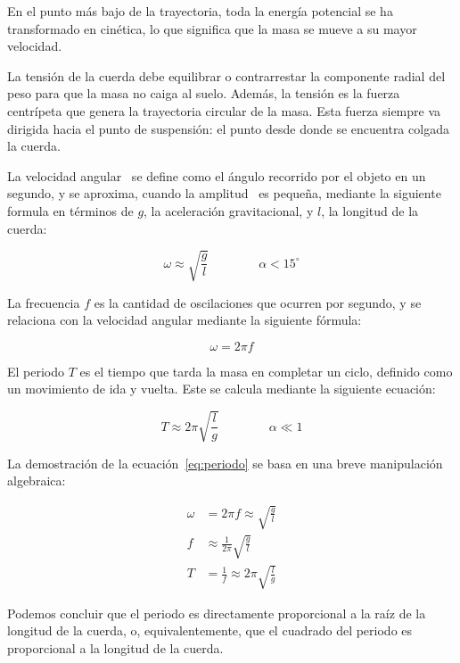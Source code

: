 \documentclass[twocolumn]{article}
\numberwithin{table}{section}
\begin{document}
En el punto más bajo de la trayectoria, toda la energía potencial se
ha transformado en cinética, lo que significa que la masa se mueve a
su mayor velocidad.

La tensión de la cuerda debe equilibrar o contrarrestar la componente
radial del peso para que la masa no caiga al suelo. Además, la
tensión es la fuerza centrípeta que genera la trayectoria circular de
la masa. Esta fuerza siempre va dirigida hacia el punto de
suspensión: el punto desde donde se encuentra colgada la cuerda.

La velocidad angular~\omega{} se define como el ángulo recorrido por
el objeto en un segundo, y se aproxima, cuando la amplitud~\alpha{} es
pequeña, mediante la siguiente formula en términos de $g$, la
aceleración gravitacional, y $l$, la longitud de la cuerda:

\begin{equation}
  \omega \approx \sqrt{\frac{g}{l}} \qquad\qquad \alpha < 15^{\circ}
\end{equation}

La frecuencia $f$ es la cantidad de oscilaciones que ocurren por
segundo, y se relaciona con la velocidad angular \omega{} mediante la
siguiente fórmula:

\begin{equation}
  \omega = 2 \pi f
\end{equation}

El periodo $T$ es el tiempo que tarda la masa en completar un ciclo,
definido como un movimiento de ida y vuelta. Este se calcula
mediante la siguiente ecuación:

\begin{equation}
  T \approx 2\pi\sqrt{\frac{l}{g}} \qquad\qquad \alpha \ll 1
  \label{eq:periodo}
\end{equation}

La demostración de la ecuación~\eqref{eq:periodo} se basa en una
breve manipulación algebraica:

\begin{align*}
  \omega &= 2\pi f \approx \sqrt{\frac{g}{l}} \\
  f &\approx \frac{1}{2\pi}\sqrt{\frac{g}{l}} \\
  T &= \frac{1}{f} \approx 2\pi\sqrt{\frac{l}{g}}
\end{align*}

Podemos concluir que el periodo es directamente proporcional a la raíz de la
longitud de la cuerda, o, equivalentemente, que el cuadrado del periodo es
proporcional a la longitud de la cuerda.
\end{document}
